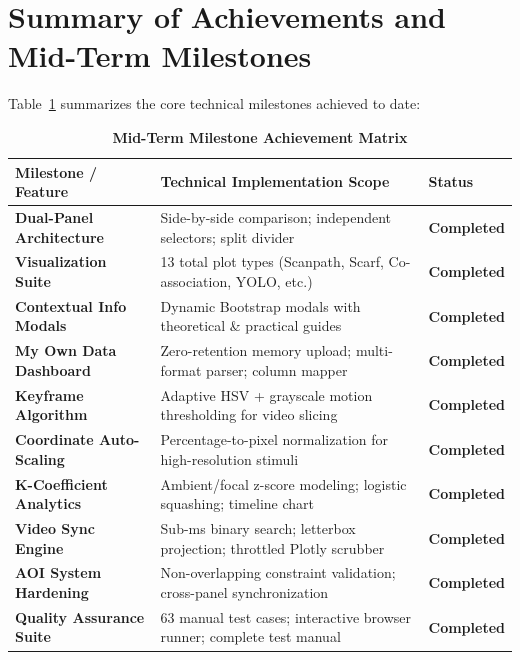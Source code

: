 \documentclass[11pt,a4paper]{article}
\begin{document}
\section{Summary of Achievements and Mid-Term Milestones}
\label{sec:milestones}

Table~\ref{tab:milestones} summarizes the core technical milestones achieved to date:

\begin{table}[H]
    \centering
    \caption{\textbf{Mid-Term Milestone Achievement Matrix}}
    \label{tab:milestones}
    \footnotesize
    \begin{tabularx}{\linewidth}{l X l}
        \toprule
        \textbf{Milestone / Feature} & \textbf{Technical Implementation Scope} & \textbf{Status} \\
        \midrule
        \textbf{Dual-Panel Architecture} & Side-by-side comparison; independent selectors; split divider & \textbf{Completed} \\
        \textbf{Visualization Suite} & 13 total plot types (Scanpath, Scarf, Co-association, YOLO, etc.) & \textbf{Completed} \\
        \textbf{Contextual Info Modals} & Dynamic Bootstrap modals with theoretical \& practical guides & \textbf{Completed} \\
        \textbf{My Own Data Dashboard} & Zero-retention memory upload; multi-format parser; column mapper & \textbf{Completed} \\
        \textbf{Keyframe Algorithm} & Adaptive HSV + grayscale motion thresholding for video slicing & \textbf{Completed} \\
        \textbf{Coordinate Auto-Scaling} & Percentage-to-pixel normalization for high-resolution stimuli & \textbf{Completed} \\
        \textbf{K-Coefficient Analytics} & Ambient/focal z-score modeling; logistic squashing; timeline chart & \textbf{Completed} \\
        \textbf{Video Sync Engine} & Sub-ms binary search; letterbox projection; throttled Plotly scrubber & \textbf{Completed} \\
        \textbf{AOI System Hardening} & Non-overlapping constraint validation; cross-panel synchronization & \textbf{Completed} \\
        \textbf{Quality Assurance Suite} & 63 manual test cases; interactive browser runner; complete test manual & \textbf{Completed} \\
        \bottomrule
    \end{tabularx}
\end{table}
\end{document}
